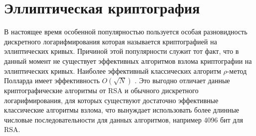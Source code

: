 \chapter{Эллиптическая криптография}
В настоящее время особенной популярностью пользуется особая
разновидность дискретного логарифмирования которая называется
криптографией на эллиптических кривых. Причиной этой популярности
служит тот факт, что в данный момент не существует эффективных
алгоритмов взлома криптографии на эллиптических кривых. Наиболее
эффективный классических алгоритм $\rho$-метод Полларда имеет
эффективность $O\left(\sqrt{N}\right)$ \cite{Pollard}. Это
выгодно отличает данные 
криптографические алгоритмы от RSA и обычного дискретного
логарифмирования, для которых существуют достаточно эффективные
классические алгоритмы взлома, что вынуждает использовать более
длинные числовые последовательности для данных алгоритмов, например
4096 бит для RSA.
 



